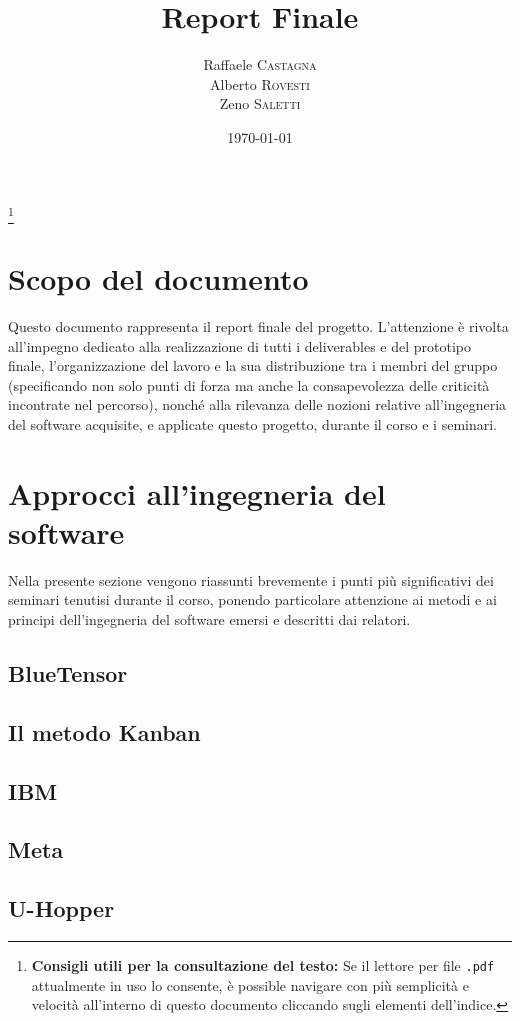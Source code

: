 \documentclass[11pt, a4paper]{article}
\title{Report Finale}
\author{Raffaele \textsc{Castagna}\\
Alberto \textsc{Rovesti}\\
Zeno \textsc{Saletti}}
\date{\today}
\theoremstyle{definition}
\newcommand\blfootnote[1]{%
  \begingroup
  \renewcommand\thefootnote{}\footnote{#1}%
  \addtocounter{footnote}{-1}%
  \endgroup
}
\begin{document}


\tableofcontents\blfootnote{\textbf{Consigli utili per la consultazione del testo:} Se il lettore per file \texttt{.pdf} attualmente in uso lo consente, è possible navigare con più semplicità e velocità all'interno di questo documento cliccando sugli elementi dell'indice.}


\newpage
\section*{Scopo del documento}
Questo documento rappresenta il report finale del progetto. L'attenzione è
rivolta all'impegno dedicato alla realizzazione di tutti i
deliverables e del prototipo finale, l'organizzazione del lavoro e la sua
distribuzione tra i membri del gruppo (specificando non solo punti di forza
ma anche la consapevolezza delle criticità incontrate nel percorso), nonché
alla rilevanza delle nozioni relative all'ingegneria del software acquisite,
e applicate  questo progetto, durante il corso e i seminari.


\newpage
\section{Approcci all'ingegneria del software}
Nella presente sezione vengono riassunti brevemente i punti più significativi
dei seminari tenutisi durante il corso, ponendo particolare attenzione ai
metodi e ai principi dell'ingegneria del software emersi e descritti dai
relatori.

\subsection{BlueTensor}
\subsection{Il metodo Kanban}
\subsection{IBM}
\subsection{Meta}
\subsection{U-Hopper}
\end{document}
